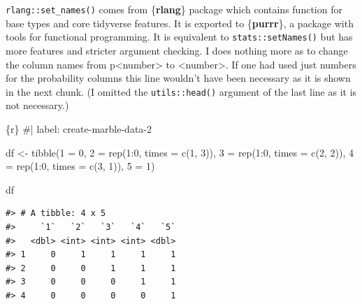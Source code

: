 \documentclass[
  letterpaper,
  DIV=11,
  numbers=noendperiod]{scrreprt}
\newenvironment{Shaded}{\begin{snugshade}}{\end{snugshade}}
\newcommand{\AttributeTok}[1]{\textcolor[rgb]{0.40,0.45,0.13}{#1}}
\newcommand{\CommentTok}[1]{\textcolor[rgb]{0.37,0.37,0.37}{#1}}
\newcommand{\DecValTok}[1]{\textcolor[rgb]{0.68,0.00,0.00}{#1}}
\newcommand{\FunctionTok}[1]{\textcolor[rgb]{0.28,0.35,0.67}{#1}}
\newcommand{\InformationTok}[1]{\textcolor[rgb]{0.37,0.37,0.37}{#1}}
\newcommand{\NormalTok}[1]{\textcolor[rgb]{0.00,0.23,0.31}{#1}}
\newcommand{\OtherTok}[1]{\textcolor[rgb]{0.00,0.23,0.31}{#1}}
\newcommand{\SpecialCharTok}[1]{\textcolor[rgb]{0.37,0.37,0.37}{#1}}
\newcommand{\StringTok}[1]{\textcolor[rgb]{0.13,0.47,0.30}{#1}}
\begin{document}
\texttt{rlang::set\_names()} comes from \{\textbf{rlang}\} package which
contains function for base types and core tidyverse features. It is
exported to \{\textbf{purrr}\}, a package with tools for functional
programming. It is equivalent to \texttt{stats::setNames()} but has more
features and stricter argument checking. I does nothing more as to
change the column names from p\textless number\textgreater{} to
\textless number\textgreater. If one had used just numbers for the
probability columns this line wouldn't have been necessary as it is
shown in the next chunk. (I omitted the \texttt{utils::head()} argument
of the last line as it is not necessary.)

\begin{Shaded}
\begin{Highlighting}[]
\InformationTok{\textasciigrave{}\textasciigrave{}\textasciigrave{}\{r\}}
\CommentTok{\#| label: create{-}marble{-}data{-}2}

\NormalTok{df }\OtherTok{\textless{}{-}}
  \FunctionTok{tibble}\NormalTok{(}\StringTok{\textasciigrave{}}\AttributeTok{1}\StringTok{\textasciigrave{}} \OtherTok{=} \DecValTok{0}\NormalTok{,}
         \StringTok{\textasciigrave{}}\AttributeTok{2}\StringTok{\textasciigrave{}} \OtherTok{=} \FunctionTok{rep}\NormalTok{(}\DecValTok{1}\SpecialCharTok{:}\DecValTok{0}\NormalTok{, }\AttributeTok{times =} \FunctionTok{c}\NormalTok{(}\DecValTok{1}\NormalTok{, }\DecValTok{3}\NormalTok{)),}
         \StringTok{\textasciigrave{}}\AttributeTok{3}\StringTok{\textasciigrave{}} \OtherTok{=} \FunctionTok{rep}\NormalTok{(}\DecValTok{1}\SpecialCharTok{:}\DecValTok{0}\NormalTok{, }\AttributeTok{times =} \FunctionTok{c}\NormalTok{(}\DecValTok{2}\NormalTok{, }\DecValTok{2}\NormalTok{)),}
         \StringTok{\textasciigrave{}}\AttributeTok{4}\StringTok{\textasciigrave{}} \OtherTok{=} \FunctionTok{rep}\NormalTok{(}\DecValTok{1}\SpecialCharTok{:}\DecValTok{0}\NormalTok{, }\AttributeTok{times =} \FunctionTok{c}\NormalTok{(}\DecValTok{3}\NormalTok{, }\DecValTok{1}\NormalTok{)),}
         \StringTok{\textasciigrave{}}\AttributeTok{5}\StringTok{\textasciigrave{}} \OtherTok{=} \DecValTok{1}\NormalTok{)}

\NormalTok{df}
\InformationTok{\textasciigrave{}\textasciigrave{}\textasciigrave{}}
\end{Highlighting}
\end{Shaded}

\begin{verbatim}
#> # A tibble: 4 x 5
#>     `1`   `2`   `3`   `4`   `5`
#>   <dbl> <int> <int> <int> <dbl>
#> 1     0     1     1     1     1
#> 2     0     0     1     1     1
#> 3     0     0     0     1     1
#> 4     0     0     0     0     1
\end{verbatim}
\end{document}
